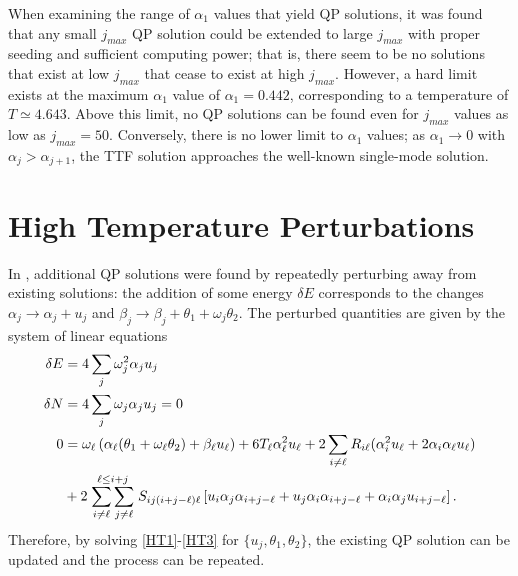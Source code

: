 \documentclass[../PhD.tex]{subfiles}
\begin{document}
When examining the range of $\alpha_1$ values that yield QP solutions, it was found that any small $j_{max}$ QP solution could be extended to large $j_{max}$ with proper seeding and sufficient computing power; that is, there seem to be no solutions that exist at low $j_{max}$ that cease to exist at high $j_{max}$. However, a hard limit exists at the maximum $\alpha_1$ value of $\alpha_1=0.442$, corresponding to a temperature of $T \simeq 4.643$. Above this limit, no QP solutions can be found even for $j_{max}$ values as low as $j_{max}=50$. Conversely, there is no lower limit to $\alpha_1$ values; as $\alpha_1 \to 0$ with $\alpha_j > \alpha_{j+1}$, the TTF solution approaches the well-known single-mode solution.


\section{High Temperature Perturbations}
\label{ssec: highT}

In \cite{1507.08261}, additional QP solutions were found by repeatedly perturbing away from existing solutions: the addition of some energy $\delta E$ corresponds to the changes $\alpha_j \to \alpha_j + u_j$ and $\beta_j \to \beta_j + \theta_1 + \omega_j \theta_2$. The perturbed quantities are given by the system of linear equations
\begin{align}
\label{HT1}
\delta E &= 4 \sum_j \omega^2_j \alpha_j u_j \\
\label{HT2}
\delta N &= 4 \sum_j \omega_j \alpha_j u_j = 0 \\
\label{HT3}
0 &= \omega_\ell \left( \alpha_\ell (\theta_1 + \omega_\ell \theta_2) +\beta_\ell u_\ell \right) + 6T_\ell \alpha_\ell^2 u_\ell + 2 \sum_{i \neq \ell} R_{i\ell} (\alpha_i^2 u_\ell + 2 \alpha_i \alpha_\ell u_\ell ) \nonumber \\
& + 2 \stackrel{\ell \leq i + j}{\sum_{i \neq \ell} \sum_{j \neq \ell}} S_{ij(i+j-\ell)\ell} \left[ u_i \alpha_j \alpha_{i+j-\ell} + u_j \alpha_i \alpha_{i+j-\ell} + \alpha_i \alpha_j u_{i+j-\ell} \right].
\end{align}
Therefore, by solving \eqref{HT1}-\eqref{HT3} for $\{ u_j, \theta_1, \theta_2 \}$, the existing QP solution can be updated and the process can be repeated. 
\end{document}
